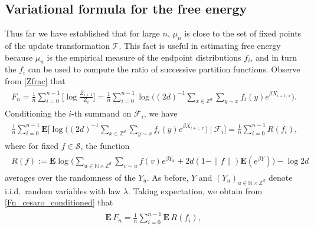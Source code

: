 \documentclass[11pt,reqno]{amsart}
\numberwithin{equation}{section}
\theoremstyle{definition}
\begin{document}
\subsection{Variational formula for the free energy} \label{calculations}
Thus far we have established that for large $n$, $\mu_n$ is close to the set of fixed points of the update transformation ${\mathcal{T}}$.
This fact is useful in estimating free energy because $\mu_n$ is the empirical measure of the endpoint distributions $f_i$, and in turn the $f_i$ can be used to compute the ratio of successive partition functions.
Observe from \eqref{Zfrac} that
{\begin{align} \begin{split} {
F_n = \frac{1}{n}\sum_{i = 0}^{n-1} \bigg[\log \frac{Z_{i+1}}{Z_{i}}\bigg] 
= \frac{1}{n} \sum_{i = 0}^{n-1} \log\bigg((2d)^{-1}\sum_{x \in {\mathbb{Z}}^d} \sum_{y \sim x} f_i(y)e^{\beta X_{i+1,\, x}}\bigg). \label{Fn_cesaro}
} \end{split} \end{align}}
Conditioning the $i$-th summand on ${\mathcal{F}}_i$, we have
{\begin{align} \begin{split} {
\frac{1}{n} \sum_{i = 0}^{n-1} {\mathbf{E}}{\Bigg[ {\log\bigg((2d)^{-1}\sum_{x \in {\mathbb{Z}}^d} \sum_{y \sim x} f_i(y)e^{\beta X_{i+1,\, x}}\bigg)} \: \Bigg| \: {{\mathcal{F}}_{i}} \Bigg]} \label{Fn_cesaro_conditioned}
= \frac{1}{n} \sum_{i = 0}^{n-1} R(f_i),
} \end{split} \end{align}}
where for fixed $f \in {\mathcal{S}}$, the function
{\begin{align} \begin{split} {
R(f) := {\mathbf{E}} \log\bigg(\sum_{u \in {\mathbb{N}} \times {\mathbb{Z}}^d} \sum_{v \sim u} f(v)e^{\beta Y_u} + 2d(1-\|f\|){\mathbf{E}}(e^{\beta Y})\bigg) - \log 2d \label{R_def}
} \end{split} \end{align}}
averages over the randomness of the $Y_u$.
As before, $Y$ and  $(Y_u)_{u \in {\mathbb{N}} \times {\mathbb{Z}}^d}$ denote i.i.d.~random variables with law $\lambda$. 
Taking expectation, we obtain from \eqref{Fn_cesaro_conditioned} that
{\begin{align} \begin{split} {
{\mathbf{E}}\, F_n = \frac{1}{n} \sum_{i = 0}^{n-1} {\mathbf{E}}\, R(f_i), \label{full_expectation}
} \end{split} \end{align}}
\end{document}

